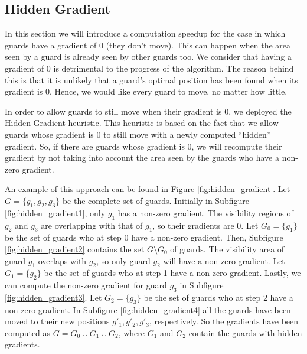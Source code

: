 \subsection{Hidden Gradient}
\label{sec:hidden_gradient}
In this section we will introduce a computation speedup for the case in which guards have a gradient of 0 (they don't move). This can happen when the area seen by a guard is already seen by other guards too. We consider that having a gradient of 0 is detrimental to the progress of the algorithm. The reason behind this is that it is unlikely that a guard's optimal position has been found when its gradient is 0. Hence, we would like every guard to move, no matter how little.

In order to allow guards to still move when their gradient is 0, we deployed the Hidden Gradient heuristic. This heuristic is based on the fact that we allow guards whose gradient is 0 to still move with a newly computed ``hidden'' gradient. So, if there are guards whose gradient is 0, we will recompute their gradient by not taking into account the area seen by the guards who have a non-zero gradient.

An example of this approach can be found in Figure \ref{fig:hidden_gradient}. Let $G = \{g_1, g_2, g_3\}$ be the complete set of guards. Initially in Subfigure \ref{fig:hidden_gradient1}, only $g_1$ has a non-zero gradient. The visibility regions of $g_2$ and $g_3$ are overlapping with that of $g_1$, so their gradients are 0. Let $G_0 = \{g_1\}$ be the set of guards who at step 0 have a non-zero gradient. 
Then, Subfigure \ref{fig:hidden_gradient2} contains the set $G \setminus G_0$ of guards. The visibility area of guard $g_1$ overlaps with $g_2$, so only guard $g_2$ will have a non-zero gradient. Let $G_1 = \{g_2\}$ be the set of guards who at step 1 have a non-zero gradient.
Lastly, we can compute the non-zero gradient for guard $g_3$ in Subfigure \ref{fig:hidden_gradient3}. Let $G_2 = \{g_3\}$ be the set of guards who at step 2 have a non-zero gradient.
In Subfigure \ref{fig:hidden_gradient4} all the guards have been moved to their new positions $g'_1, g'_2, g'_3$, respectively. So the gradients have been computed as $G = G_0 \cup G_1 \cup G_2$, where $G_1$ and $G_2$ contain the guards with hidden gradients.

